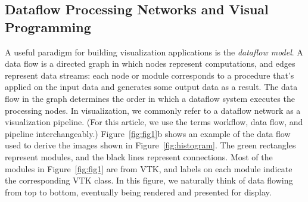 \documentclass[11pt,twocolumn]{article}
\begin{document}
\subsection{Dataflow Processing Networks and Visual Programming}
A useful paradigm for building visualization applications is the
\emph{dataflow model}. A data flow is a directed graph in which nodes
represent computations, and edges represent data streams: each node or
module corresponds to a procedure that’s applied on the input data and
generates some output data as a result. The data flow in the graph
determines the order in which a dataflow system executes the
processing nodes. In visualization, we commonly refer to a dataflow
network as a visualization pipeline. (For this article, we use the
terms workflow, data flow, and pipeline interchangeably.)
Figure~\ref{fig:fig1}b shows an example of the data flow used to
derive the images shown in Figure~\ref{fig:histogram}. The green
rectangles represent modules, and the black lines represent
connections. Most of the modules in Figure~\ref{fig:fig1} are from VTK, and
labels on each module indicate the corresponding VTK class. In this
figure, we naturally think of data flowing from top to bottom,
eventually being rendered and presented for display.

 

\end{document}

